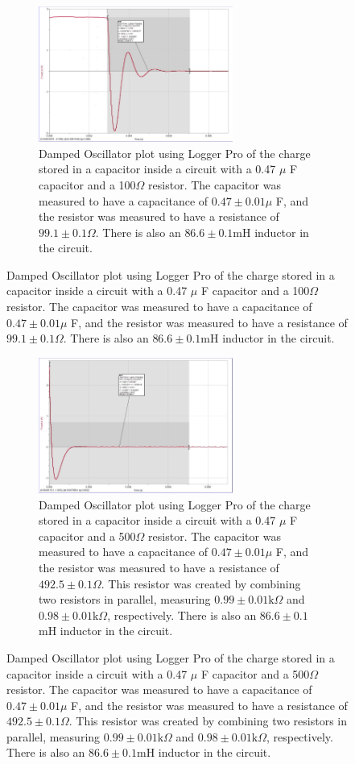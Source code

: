 \documentclass[12pt]{article}
\begin{document}
\begin{figure} [h]
    \begin{subfigure}
        \centering
        \includegraphics[width=0.7\textwidth]{figures/images/LCR_D3_Logger-Plot.jpg}
        \caption{Damped Oscillator plot using Logger Pro of the charge stored in a capacitor inside a circuit with a 0.47 $\mu$ F capacitor and a 100$\Omega$ resistor. The capacitor was measured to have a capacitance of $0.47\pm0.01\mu$ F, and the resistor was measured to have a resistance of $99.1\pm0.1\Omega$. There is also an $86.6\pm0.1$mH inductor in the circuit.}
        \label{fig:D3_47C_100R}
    \end{subfigure}
\end{figure}

\begin{figure} [h]
    \begin{subfigure}
        \centering
        \includegraphics[width=0.7\textwidth]{figures/images/LCR_D4_Logger-Plot.jpg}
        \caption{Damped Oscillator plot using Logger Pro of the charge stored in a capacitor inside a circuit with a 0.47 $\mu$ F capacitor and a 500$\Omega$ resistor. The capacitor was measured to have a capacitance of $0.47\pm0.01\mu$ F, and the resistor was measured to have a resistance of $492.5\pm0.1\Omega$. This resistor was created by combining two resistors in parallel, measuring $0.99\pm0.01\text{k}\Omega$ and $0.98\pm0.01\text{k}\Omega$, respectively. There is also an $86.6\pm0.1$mH inductor in the circuit.}
        \label{fig:D4_47C_500R}
    \end{subfigure}
\end{figure}
\end{document}
